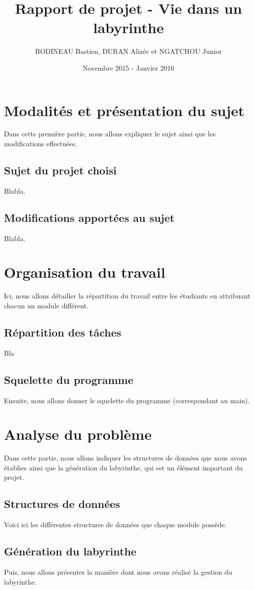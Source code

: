 \documentclass[a4paper,11pt]{report}
\title{Rapport de projet - Vie dans un labyrinthe}
\author{BODINEAU Bastien, DURAN Alizée et NGATCHOU Junior}
\date{Novembre 2015 - Janvier 2016}
\begin{document}
\maketitle
\tableofcontents

\chapter{Modalités et présentation du sujet}
Dans cette première partie, nous allons expliquer le sujet ainsi que les modifications effectuées.
\section{Sujet du projet choisi}
Blabla.
\section{Modifications apportées au sujet}
Blabla.
\chapter{Organisation du travail}
Ici, nous allons détailler la répartition du travail entre les étudiants en attribuant chacun un module différent.
\section{Répartition des tâches}
Bla
\section{Squelette du programme}
Ensuite, nous allons donner le squelette du programme (correspondant au main).
\chapter{Analyse du problème}
Dans cette partie, nous allons indiquer les structures de données que nous avons établies ainsi que la génération du labyrinthe, qui est un élément important du projet.
\section{Structures de données}
Voici ici les différentes structures de données que chaque module possède.
\section{Génération du labyrinthe}
Puis, nous allons présenter la manière dont nous avons réalisé la gestion du labyrinthe.
\end{document}
